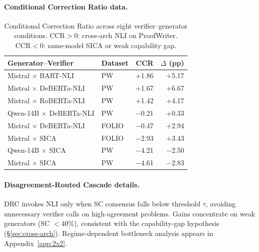 \paragraph{Conditional Correction Ratio data.}
\label{app:cil-data}

\begin{table}[h]
\centering
\small
\setlength{\tabcolsep}{3pt}
\caption{Conditional Correction Ratio across eight verifier--generator conditions. $\text{CCR} > 0$: cross-arch NLI on ProofWriter. $\text{CCR} < 0$: same-model SICA or weak capability gap.}
\label{tab:cil_main}
\begin{tabular}{@{}llrr@{}}
\toprule
Generator--Verifier & Dataset & CCR & $\Delta$ (pp) \\
\midrule
Mistral $\times$ BART-NLI & PW & $+$1.86 & $+$5.17 \\
Mistral $\times$ DeBERTa-NLI & PW & $+$1.67 & $+$6.67 \\
Mistral $\times$ RoBERTa-NLI & PW & $+$1.42 & $+$4.17 \\
\addlinespace
Qwen-14B $\times$ DeBERTa-NLI & PW & $-$0.21 & $+$0.33 \\
Mistral $\times$ DeBERTa-NLI & FOLIO & $-$0.47 & $+$2.94 \\
\addlinespace
Mistral $\times$ SICA & FOLIO & $-$2.93 & $+$3.43 \\
Qwen-14B $\times$ SICA & PW & $-$4.21 & $-$2.50 \\
Mistral $\times$ SICA & PW & $-$4.61 & $-$2.83 \\
\bottomrule
\end{tabular}
\end{table}

\paragraph{Disagreement-Routed Cascade details.}
\label{app:drc}
DRC invokes NLI only when SC consensus falls below threshold $\tau$, avoiding unnecessary verifier calls on high-agreement problems. Gains concentrate on weak generators (SC $< 40\%$), consistent with the capability-gap hypothesis (\S\ref{sec:cross-arch}). Regime-dependent bottleneck analysis appears in Appendix~\ref{app:2x2}.

